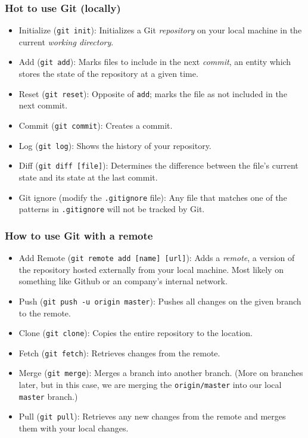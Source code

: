 \documentclass{lug}
\begin{document}
\begin{frame}
    \frametitle{Hot to use Git (locally)}

    \begin{itemize}
        \item Initialize (\texttt{git init}): Initializes a Git
            \textit{repository} on your local machine in the current
            \textit{working directory}.
        \item Add (\texttt{git add}): Marks files to include in the next
            \textit{commit}, an entity which stores the state of the repository
            at a given time.
        \item Reset (\texttt{git reset}): Opposite of \texttt{add}; marks the
            file as not included in the next commit.
        \item Commit (\texttt{git commit}): Creates a commit.
        \item Log (\texttt{git log}): Shows the history of your repository.
        \item Diff (\texttt{git diff [file]}): Determines the difference between
            the file's current state and its state at the last commit.
        \item Git ignore (modify the \texttt{.gitignore} file): Any file that
            matches one of the patterns in \texttt{.gitignore} will not be
            tracked by Git.
    \end{itemize}
\end{frame}

\begin{frame}
    \frametitle{How to use Git with a remote}

    \begin{itemize}
        \item Add Remote (\texttt{git remote add [name] [url]}): Adds a
            \textit{remote}, a version of the repository hosted externally from
            your local machine. Most likely on something like Github or an
            company's internal network.
        \item Push (\texttt{git push -u origin master}): Pushes all changes on
            the given branch to the remote.
        \item Clone (\texttt{git clone}): Copies the entire repository to the
            location.
        \item Fetch (\texttt{git fetch}): Retrieves changes from the remote.
        \item Merge (\texttt{git merge}): Merges a branch into another branch.
            (More on branches later, but in this case, we are merging the
            \texttt{origin/master} into our local \texttt{master} branch.)
        \item Pull (\texttt{git pull}): Retrieves any new changes from the
            remote and merges them with your local changes.
    \end{itemize}
\end{frame}
\end{document}
